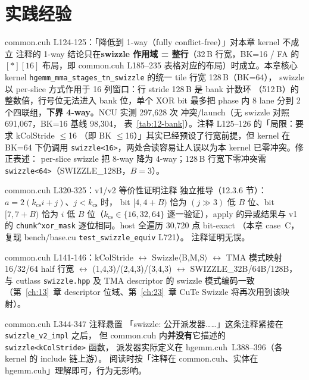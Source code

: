 \section{实践经验}

\begin{kaogu}[F3 + NCU 实证]{common.cuh L124-125：「降低到 1-way（fully conflict-free）」对本章 kernel 不成立}
  注释的 1-way 结论只在\textbf{swizzle 作用域 = 整行}（32\,B 行宽，BK=16 / FA 的
  $[\ast][16]$ 布局，即 common.cuh L185--235 表格对应的布局）时成立。本章核心
  kernel \texttt{hgemm\_\allowbreak{}mma\_\allowbreak{}stages\_\allowbreak{}tn\_\allowbreak{}swizzle} 的统一 tile 行宽 128\,B（BK=64），
  swizzle 以 per-slice 方式作用于 16 列窗口：行 stride 128\,B 是 bank 计数环
  （512\,B）的整数倍，行号位无法进入 bank 位，单个 XOR bit 最多把 phase 内
  8 lane 分到 2 个四联组，\textbf{下界 4-way}。NCU 实测 297{,}628 次
  冲突/launch（无 swizzle 对照 691{,}067，BK=16 基线 98{,}304，
  表~\ref{tab:12-bank}）。注释 L125--126 的「局限：要求 kColStride $\le$16
  （即 BK $\le$16）」其实已经预设了行宽前提，但 kernel 在 BK=64 下仍调用
  \texttt{swizzle<16>}，两处合读容易让人误以为本 kernel 已零冲突。修正表述：
  per-slice swizzle 把 8-way 降为 4-way；128\,B 行宽下零冲突需
  \texttt{swizzle<64>}（SWIZZLE\_128B，$B{=}3$）。
\end{kaogu}

\begin{kaogu}[F3 核校通过]{common.cuh L320-325：v1/v2 等价性证明注释}
  独立推导（12.3.6 节）：$a=2(k_{\mathrm{cs}}i+j)$、$j<k_{\mathrm{cs}}$ 时，
  bit $[4,4{+}B)$ 恰为 $(j{\gg}3)$ 低 $B$ 位、bit $[7,7{+}B)$ 恰为 $i$ 低 $B$
  位（$k_{\mathrm{cs}}\in\{16,32,64\}$ 逐一验证），apply 的异或结果与 v1 的
  \texttt{chunk\^{}xor\_\allowbreak{}mask} 逐位相同。host 全遍历 30{,}720 点 bit-exact
  （本章 case~C，复现 bench/base.cu \texttt{test\_\allowbreak{}swizzle\_\allowbreak{}equiv} L721）。
  注释证明无误。
\end{kaogu}

\begin{kaogu}[F1 核校通过]{common.cuh L141-146：kColStride $\leftrightarrow$ Swizzle$\langle$B,M,S$\rangle$ $\leftrightarrow$ TMA 模式映射}
  16/32/64 half 行宽 $\leftrightarrow$ (1,4,3)/(2,4,3)/(3,4,3) $\leftrightarrow$
  SWIZZLE\_32B/64B/128B，与 cutlass \texttt{swizzle.hpp} 及 TMA descriptor 的
  swizzle 模式编码一致（第~\ref{ch:13}~章 descriptor 位域、第~\ref{ch:23}~章
  CuTe Swizzle 将再次用到该映射）。
\end{kaogu}

\begin{kaogu}[位置考据]{common.cuh L344-347 注释悬置}
  「swizzle: 公开派发器……」这条注释紧接在 \texttt{swizzle\_\allowbreak{}v2\_\allowbreak{}impl} 之后，
  但 common.cuh 内\textbf{并没有}它描述的 \texttt{swizzle\allowbreak{}<k\allowbreak{}Col\allowbreak{}Stride>} 函数，
  派发器实际定义在 hgemm.cuh~L388--396（各 kernel 的 include 链上游）。
  阅读时按「注释在 common.cuh、实体在 hgemm.cuh」理解即可，行为无影响。
\end{kaogu}

